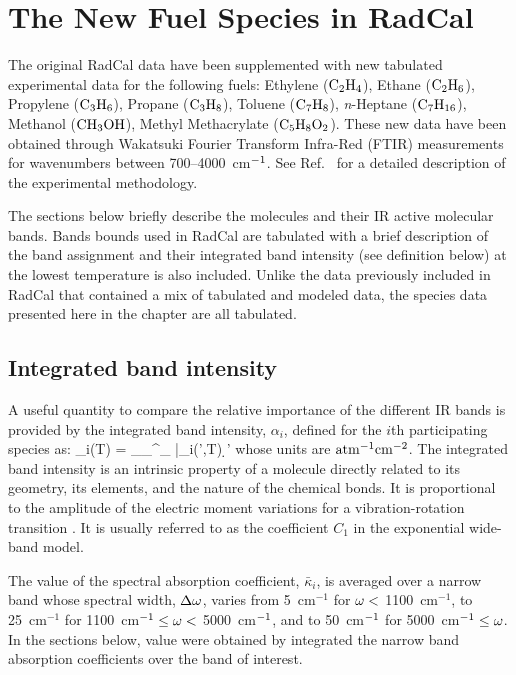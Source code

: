 

\chapter{The New Fuel Species in RadCal}
\label{chap:new_species}

The original RadCal data have been supplemented with new tabulated experimental data for the following fuels: Ethylene ($\rm C_2H_4$), Ethane ($\rm C_2H_6$), Propylene ($\rm C_3H_6$), Propane ($\rm C_3H_8$), Toluene ($\rm C_7H_8$), \textit{n}-Heptane ($\rm C_7H_{16}$), Methanol ($\rm CH_3OH$), Methyl Methacrylate ($\rm C_5H_8O_2$). These new data have been obtained through Wakatsuki Fourier Transform Infra-Red (FTIR) measurements for wavenumbers between 700--4000~cm$\rm ^{-1}$. See Ref.~\cite{Wakatsuki2005b} for a detailed description of the experimental methodology.

The sections below briefly describe the molecules and their IR active molecular bands. Bands bounds used in RadCal are tabulated with a brief description of the band assignment and their integrated band intensity (see definition below) at the lowest temperature is also included. Unlike the data previously included in RadCal that contained a mix of tabulated and modeled data, the species data presented here in the chapter are all tabulated.

\section{Integrated band intensity}
\label{sec:integrated_intensity}

A useful quantity to compare the relative importance of the different IR bands is provided by the integrated band intensity, $\alpha_i$, defined for the $i$th participating species as:
\be\label{eq:alpha}
  \alpha_i(T) = \displaystyle\int_{\om_{\min}}^{\om_{\max}} \bar{\kappa}_i(\om',T) \; \d \om'
\ee
whose units are $\rm {atm^{-1} cm^{-2}}$. The integrated band intensity is an intrinsic property of a molecule directly related to its geometry, its elements, and the nature of the chemical bonds. It is proportional to the amplitude of the electric moment variations for a vibration-rotation transition \cite{Matheson1932}. It is usually referred to as the coefficient $C_1$ in the exponential wide-band model.

The value of the spectral absorption coefficient, $\bar{\kappa}_i$, is averaged over a narrow band whose spectral width, $\Delta \omega$, varies from 5~cm$^{-1}$ for $\omega < $ 1100~cm$^{-1}$, to 25~cm$^{-1}$ for 1100~cm$^{-1} \leq \omega < $ 5000~cm$^{\rm -1}$, and to 50~cm$^{\rm -1}$ for 5000~cm$^{\rm -1}\leq \omega$. In the sections below, value were obtained by integrated the narrow band absorption coefficients over the band of interest.

